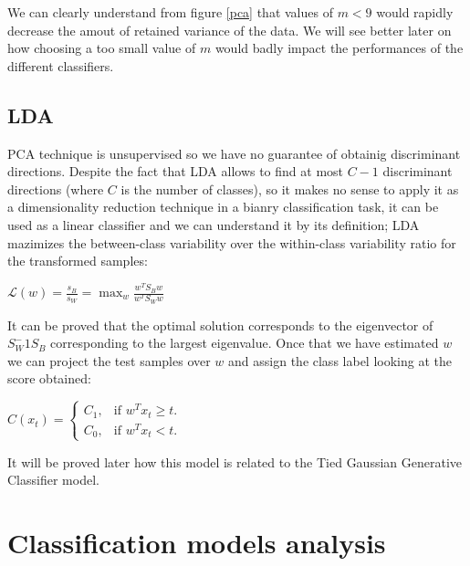 \documentclass[10pt, a4paper, twocolumn]{article} %
\begin{document}
We can clearly understand from figure \ref{pca} that values of $m < 9$ would rapidly
decrease the amout of retained variance of the data. We will see better later on how 
choosing a too small value of $m$ would badly impact the performances of the different classifiers.

\subsection{LDA}
PCA technique is unsupervised so we have no guarantee of obtainig discriminant directions.
Despite the fact that LDA allows to find at most $C - 1$ discriminant directions (where $C$ is the number of classes), so 
it makes no sense to apply it as a dimensionality reduction technique in a bianry classification task, it can
be used as a linear classifier and we can understand it by its definition; LDA mazimizes the
between-class variability over the within-class variability ratio for the transformed samples:
\begin{center}
	\begin{math}
		\mathcal{L}(w) = \frac{s_{B}}{s_{W}} = \max_w \frac{w^TS_{B}w}{w^TS_{W}w}
	\end{math}
\end{center}
It can be proved that the optimal solution corresponds to the eigenvector of $S_{W}^-1S_{B}$ 
corresponding to the largest eigenvalue. Once that we have estimated $w$ we can project
the test samples over $w$ and assign the class label looking at the score obtained:\\
\begin{center}
	\begin{math}
		C(x_t)=\left\{
		\begin{array}{ll}
			C_1, & \mbox{if $w^Tx_t \ge t$}.\\
			C_0, & \mbox{if $w^Tx_t < t$}.
		\end{array}
		\right.
	\end{math}
\end{center}
It will be proved later how this model
is related to the Tied Gaussian Generative Classifier model.
\section{Classification models analysis}
\end{document}

